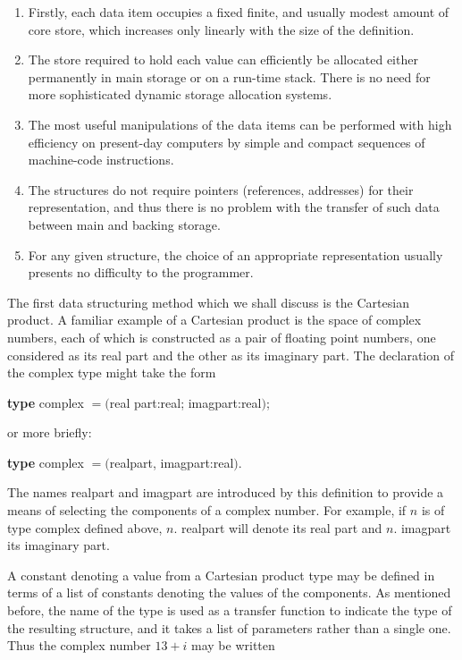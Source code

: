 \begin{enumerate}[leftmargin=2\parindent, label=(\arabic*)]
	\item Firstly, each data item occupies a fixed finite, and usually modest amount of core store, which increases only linearly with the size of the definition.

	\item The store required to hold each value can efficiently be allocated either permanently in main storage or on a run-time stack. There is no need for more sophisticated dynamic storage allocation systems.

	\item The most useful manipulations of the data items can be performed with high efficiency on present-day computers by simple and compact sequences of machine-code instructions.

	\item The structures do not require pointers (references, addresses) for their representation, and thus there is no problem with the transfer of such data between main and backing storage.

	\item For any given structure, the choice of an appropriate representation usually presents no difficulty to the programmer.
\end{enumerate}

The first data structuring method which we shall discuss is the Cartesian product. A familiar example of a Cartesian product is the space of complex numbers, each of which is constructed as a pair of floating point numbers, one considered as its real part and the other as its imaginary part. The declaration of the complex type might take the form

\quad \textbf{type} complex $= ($real part:real; imagpart:real$)$;
\nopagebreak

or more briefly:
\nopagebreak

\quad \textbf{type} complex $= ($realpart, imagpart:real$)$.

The names realpart and imagpart are introduced by this definition to provide a means of selecting the components of a complex number. For example, if $n$ is of type complex defined above, $n$. realpart will denote its real part and $n$. imagpart its imaginary part.

A constant denoting a value from a Cartesian product type may be defined in terms of a list of constants denoting the values of the components. As mentioned before, the name of the type is used as a transfer function to indicate the type of the resulting structure, and it takes a list of parameters rather than a single one. Thus the complex number $13 + i$ may be written


